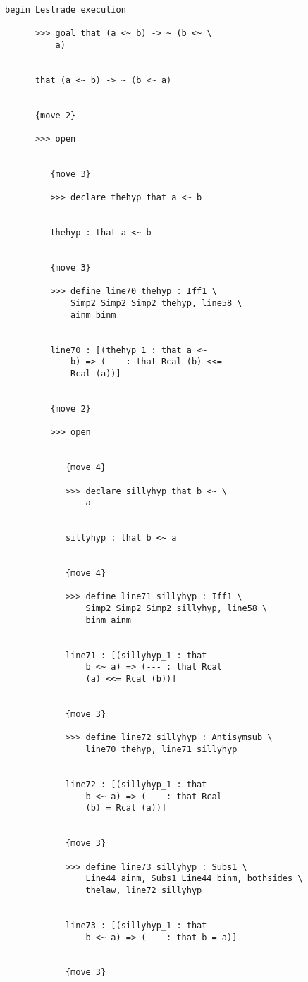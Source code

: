 \documentclass[12pt]{article}
\begin{document}
\begin{verbatim}

begin Lestrade execution

      >>> goal that (a <~ b) -> ~ (b <~ \
          a)


      that (a <~ b) -> ~ (b <~ a)


      {move 2}

      >>> open


         {move 3}

         >>> declare thehyp that a <~ b


         thehyp : that a <~ b


         {move 3}

         >>> define line70 thehyp : Iff1 \
             Simp2 Simp2 Simp2 thehyp, line58 \
             ainm binm


         line70 : [(thehyp_1 : that a <~ 
             b) => (--- : that Rcal (b) <<= 
             Rcal (a))]


         {move 2}

         >>> open


            {move 4}

            >>> declare sillyhyp that b <~ \
                a


            sillyhyp : that b <~ a


            {move 4}

            >>> define line71 sillyhyp : Iff1 \
                Simp2 Simp2 Simp2 sillyhyp, line58 \
                binm ainm


            line71 : [(sillyhyp_1 : that 
                b <~ a) => (--- : that Rcal 
                (a) <<= Rcal (b))]


            {move 3}

            >>> define line72 sillyhyp : Antisymsub \
                line70 thehyp, line71 sillyhyp


            line72 : [(sillyhyp_1 : that 
                b <~ a) => (--- : that Rcal 
                (b) = Rcal (a))]


            {move 3}

            >>> define line73 sillyhyp : Subs1 \
                Line44 ainm, Subs1 Line44 binm, bothsides \
                thelaw, line72 sillyhyp


            line73 : [(sillyhyp_1 : that 
                b <~ a) => (--- : that b = a)]


            {move 3}


\end{verbatim}
\end{document}
